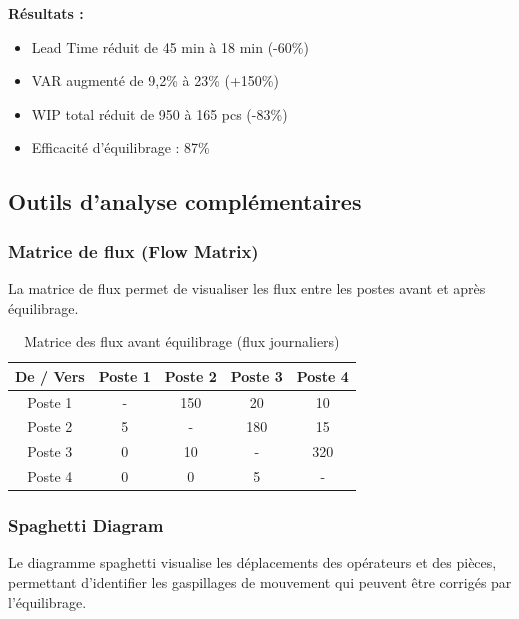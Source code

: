 \documentclass[12pt,a4paper]{article}
\begin{document}
\textbf{Résultats :}
\begin{itemize}
    \item Lead Time réduit de 45 min à 18 min (-60\%)
    \item VAR augmenté de 9,2\% à 23\% (+150\%)
    \item WIP total réduit de 950 à 165 pcs (-83\%)
    \item Efficacité d'équilibrage : 87\%
\end{itemize}

\subsection{Outils d'analyse complémentaires}

\subsubsection{Matrice de flux (Flow Matrix)}

La matrice de flux permet de visualiser les flux entre les postes avant et après équilibrage.

\begin{table}[H]
\centering
\begin{tabular}{|c|c|c|c|c|}
\hline
\textbf{De / Vers} & \textbf{Poste 1} & \textbf{Poste 2} & \textbf{Poste 3} & \textbf{Poste 4} \\
\hline
Poste 1 & - & 150 & 20 & 10 \\
\hline
Poste 2 & 5 & - & 180 & 15 \\
\hline
Poste 3 & 0 & 10 & - & 320 \\
\hline
Poste 4 & 0 & 0 & 5 & - \\
\hline
\end{tabular}
\caption{Matrice des flux avant équilibrage (flux journaliers)}
\end{table}

\subsubsection{Spaghetti Diagram}

Le diagramme spaghetti visualise les déplacements des opérateurs et des pièces, permettant d'identifier les gaspillages de mouvement qui peuvent être corrigés par l'équilibrage.
\end{document}
